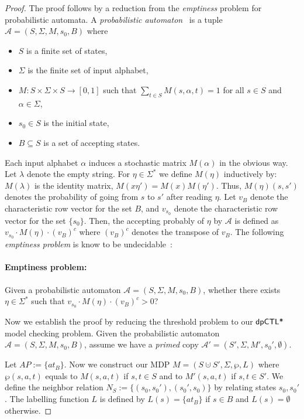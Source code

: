 \begin{proof}
The proof follows by a reduction from the \emph{emptiness} problem for probabilistic automata.
A \emph{probabilistic automaton}~\cite{Rabin63} is a tuple $\mathcal{A}= (S,\Sigma,M,s_0,B)$ where
\begin{itemize}
  \item $S$ is a finite set of states,
  \item $\Sigma$ is the finite set of input alphabet,
  \item $M: S\times\Sigma\times S \to [0,1]$ such that $\sum_{t\in S} M(s,\alpha,t)=1$ for all $s\in S$ and $\alpha\in \Sigma$,
  \item $s_0\in S$ is the initial state,
  \item $B\subseteq S$ is a set of accepting states.
\end{itemize}

Each input alphabet $\alpha$ induces a stochastic matrix $M(\alpha)$ in the obvious way. Let $\lambda$ denote the empty string. For $\eta\in\Sigma^*$ we define $M(\eta)$ inductively by: $M(\lambda)$ is the identity matrix, $M(x\eta')=M(x)M(\eta')$. Thus, $M(\eta)(s,s')$ denotes the probability of going from $s$ to $s'$ after reading $\eta$. Let $v_B$ denote the characteristic row vector for the set $B$, and $v_{s_0}$ denote the characteristic row vector for the set $\{s_0\}$. Then, the accepting probably of $\eta$ by $\mathcal{A}$ is defined as $v_{s_0}\cdot M(\eta)\cdot (v_B)^c$ where $(v_B)^c$ denotes the transpose of $v_B$. The following \emph{emptiness problem} is know to be undecidable~\cite{Paz71}:

\paragraph{Emptiness problem:} Given a probabilistic automaton $\mathcal{A}= (S,\Sigma,M,s_0,B)$, whether there exists $\eta\in\Sigma^*$ such that $v_{s_0}\cdot M(\eta)\cdot (v_B)^c > 0$?

Now we establish the proof by reducing the threshold problem to our $\textsf{dpCTL*}$ model checking problem. Given the probabilistic automaton  $\mathcal{A}= (S,\Sigma,M,s_0,B)$, assume we have a \emph{primed} copy $\mathcal{A}'= (S',\Sigma,M',s_0',\emptyset)$.

Let $AP:=\{at_B\}$. Now we construct our MDP  $M =
(S\cupdot S', \Sigma, \wp, L)$ where $\wp(s,a,t)$ equals to $M(s,a,t)$ if $s,t\in S$ and to $M'(s,a,t)$ if $s,t\in S'$. We define the neighbor relation $N_S:=\{(s_0,s_0'),(s_0',s_0)\}$ by relating states $s_0,s_0'$. The labelling function $L$ is defined by $L(s)=\{at_B\}$ if $s\in B$ and $L(s)=\emptyset$ otherwise.


\end{proof}
